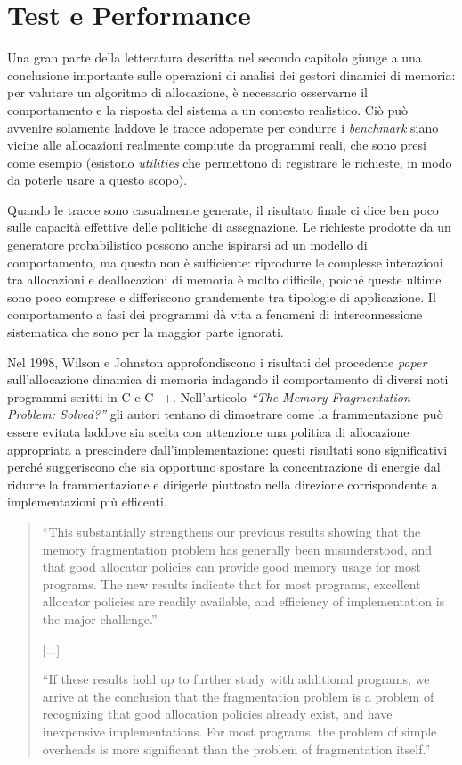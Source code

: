 \chapter[Test e Performance]{Test e Performance}

Una gran parte della letteratura descritta nel secondo capitolo giunge a una conclusione importante sulle operazioni di analisi dei gestori dinamici di memoria: per valutare un algoritmo di allocazione, è necessario osservarne il comportamento e la risposta del sistema a un contesto realistico. Ciò può avvenire solamente laddove le tracce adoperate per condurre i \textit{benchmark} siano vicine alle allocazioni realmente compiute da programmi reali, che sono presi come esempio (esistono \textit{utilities} che permettono di registrare le richieste, in modo da poterle usare a questo scopo).

Quando le tracce sono casualmente generate, il risultato finale ci dice ben poco sulle capacità effettive delle politiche di assegnazione. Le richieste prodotte da un generatore probabilistico possono anche ispirarsi ad un modello di comportamento, ma questo non è sufficiente: riprodurre le complesse interazioni tra allocazioni e deallocazioni di memoria è molto difficile, poiché queste ultime sono poco comprese e differiscono grandemente tra tipologie di applicazione. Il comportamento a fasi dei programmi dà vita a fenomeni di interconnessione sistematica che sono per la maggior parte ignorati.

Nel 1998, Wilson e Johnston approfondiscono i risultati del procedente \textit{paper} sull’allocazione dinamica di memoria indagando il comportamento di diversi noti programmi scritti in C e C++. Nell’articolo \textit{``The Memory Fragmentation Problem: Solved?''}\cite{wilson1998} gli autori tentano di dimostrare come la frammentazione può essere evitata laddove sia scelta con attenzione una politica di allocazione appropriata a prescindere dall’implementazione: questi risultati sono significativi perché suggeriscono che sia opportuno spostare la concentrazione di energie dal ridurre la frammentazione e dirigerle piuttosto nella direzione corrispondente a implementazioni più efficenti.

\begin{quote}
``This substantially strengthens our previous results showing that the memory fragmentation problem has generally been misunderstood, and that good allocator policies can provide good memory usage for most programs. The new results indicate that for most programs, excellent allocator policies are readily available, and efficiency of implementation is the major challenge.''

\begin{center}
[...]
\end{center}

``If these results hold up to further study with additional programs, we arrive at the conclusion that the fragmentation problem is a problem of recognizing that good allocation policies already exist, and have inexpensive implementations. For most programs, the problem of simple overheads is more significant than the problem of fragmentation itself.''
\end{quote} 

